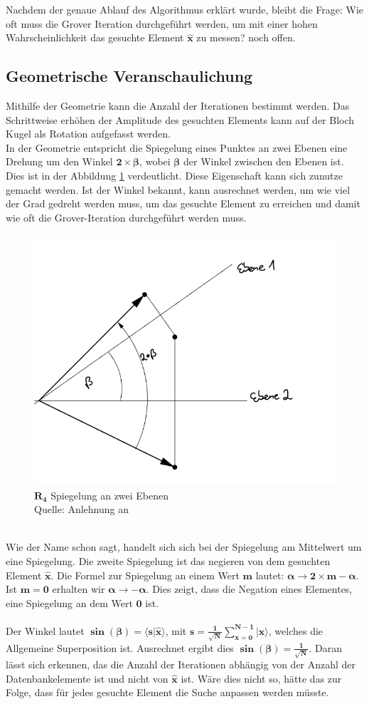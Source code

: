 Nachdem der genaue Ablauf des Algorithmus erklärt wurde, bleibt die Frage: Wie oft muss die Grover Iteration durchgeführt werden, um mit einer hohen Wahrscheinlichkeit das gesuchte Element $\mathbf{\hat{x}}$ zu messen? noch offen.

\subsection{Geometrische Veranschaulichung}
Mithilfe der Geometrie kann die Anzahl der Iterationen bestimmt werden. Das Schrittweise erhöhen der Amplitude des gesuchten Elements kann auf der Bloch Kugel als Rotation aufgefasst werden. 
\\
In der Geometrie entspricht die Spiegelung eines Punktes an zwei Ebenen eine Drehung um den Winkel $\mathbf{2 \times \beta}$, wobei $\mathbf{\beta}$ der Winkel zwischen den Ebenen ist. Dies ist in der Abbildung \ref{fig:zweiEbenen} verdeutlicht. Diese Eigenschaft kann sich zunutze gemacht werden. Ist der Winkel bekannt, kann ausrechnet werden, um wie viel der Grad gedreht werden muss, um das gesuchte Element zu erreichen und damit wie oft die Grover-Iteration durchgeführt werden muss.
 \begin{figure}[hbtp]
	\centering
	\includegraphics[width=.6\textwidth]{figures/zweiEbenen.png}
	\caption{$\mathbf{R_4}$ Spiegelung an zwei Ebenen \\ Quelle: Anlehnung an \cite[S. 149]{Ho17}}
	\label{fig:zweiEbenen}
\end{figure} 
\noindent
\\
Wie der Name schon sagt, handelt sich sich bei der Spiegelung am Mittelwert um eine Spiegelung. Die zweite Spiegelung ist das negieren von dem gesuchten Element $\mathbf{\hat{x}}$. Die Formel zur Spiegelung an einem Wert $\mathbf{m}$ lautet: $\mathbf{\alpha \rightarrow 2 \times m - \alpha}$. Ist $\mathbf{m=0}$ erhalten wir $\mathbf{\alpha \rightarrow - \alpha}$. Dies zeigt, dass die Negation eines Elementes, eine Spiegelung an dem Wert $\mathbf{0}$ ist.
\\ 
\\
Der Winkel lautet $\mathbf{\sin(\beta) = \langle s | \hat{x} \rangle}$, mit $\mathbf{s = \frac{1}{\sqrt{N}}\sum\limits_{x=0}^{N-1}|x\rangle}$, welches die Allgemeine Superposition ist. Ausrechnet ergibt dies $\mathbf{\sin(\beta) = \frac{1}{\sqrt N}}$. Daran lässt sich erkennen, das die Anzahl der Iterationen abhängig von der Anzahl der Datenbankelemente ist und nicht von $\mathbf{\hat{x}}$ ist. Wäre dies nicht so, hätte das zur Folge, dass für jedes gesuchte Element die Suche anpassen werden müsste.

